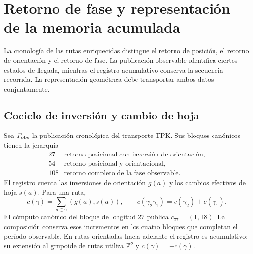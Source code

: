 
\section{Retorno de fase y representación de la memoria acumulada}
\label{vii:vii:sec:retorno-memoria-gravedad}

La cronología de las rutas enriquecidas distingue el retorno de posición,
el retorno de orientación y el retorno de fase. La publicación observable
identifica ciertos estados de llegada, mientras el registro acumulativo
conserva la secuencia recorrida. La representación geométrica debe
transportar ambos datos conjuntamente.

\subsection{Cociclo de inversión y cambio de hoja}
\label{vii:vii:subsec:cociclo-memoria}

Sea \(F_{\rm obs}\) la publicación cronológica del transporte TPK.
Sus bloques canónicos tienen la jerarquía
\[
\begin{array}{c|l}
27&\text{retorno posicional con inversión de orientación},\\
54&\text{retorno posicional y orientacional},\\
108&\text{retorno completo de la fase observable}.
\end{array}
\]
El registro cuenta las inversiones de orientación \(g(a)\) y los
cambios efectivos de hoja \(s(a)\). Para una ruta,
\begin{equation}
 c(\gamma)=\sum_{a\subset\gamma}(g(a),s(a)),\qquad
 c(\gamma_2\gamma_1)=c(\gamma_2)+c(\gamma_1).
 \label{vii:vii:eq:cociclo-ruta}
\end{equation}
El cómputo canónico del bloque de longitud \(27\) publica
\(c_{27}=(1,18)\). La composición conserva esos incrementos en
los cuatro bloques que completan el período observable.
En rutas orientadas hacia adelante el registro es acumulativo;
su extensión al grupoide de rutas utiliza \(\mathbb Z^2\) y
\(c(\bar\gamma)=-c(\gamma)\).


